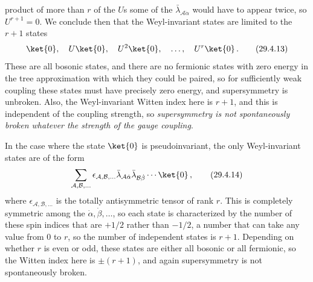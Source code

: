 product of more than \(r\) of the \(U\)s some of the
\(\bar\lambda_{\mathcal A\dot\alpha}\) would have to appear twice, so
\(U^{r+1}=0\). We conclude then that the Weyl-invariant states are limited
to the \(r+1\) states
\begin{equation}
  \ket{0},\quad U\ket{0},\quad U^2\ket{0},\quad\ldots,\quad U^r\ket{0}\,.
  \tag{29.4.13}\label{eq:29.4.13}
\end{equation}
These are all bosonic states, and there are no fermionic states with zero
energy in the tree approximation with which they could be paired, so for
sufficiently weak coupling these states must have precisely zero energy,
and supersymmetry is unbroken. Also, the Weyl-invariant Witten index here
is \(r+1\), and this is independent of the coupling strength, so
\emph{supersymmetry is not spontaneously broken whatever the strength of
the gauge coupling}.

In the case where the state \(\ket{0}\) is pseudoinvariant, the only
Weyl-invariant states are of the form
\begin{equation}
  \sum_{\mathcal A,\mathcal B,\ldots}
  \epsilon_{\mathcal A,\mathcal B,\ldots}
  \bar\lambda_{\mathcal A\dot\alpha}
  \bar\lambda_{\mathcal B\dot\beta}
  \cdots\ket{0}\,,
  \tag{29.4.14}\label{eq:29.4.14}
\end{equation}
where \(\epsilon_{\mathcal A,\mathcal B,\ldots}\) is the totally
antisymmetric tensor of rank \(r\). This is completely symmetric among the
\(\dot\alpha,\dot\beta,\ldots\), so each state is characterized by the
number of these spin indices that are \(+1/2\) rather than \(-1/2\), a number that can take any
value from 0 to \(r\), so the number of independent states is \(r+1\).
Depending on whether \(r\) is even or odd, these states are either all
bosonic or all fermionic, so the Witten index here is \(\pm(r+1)\), and
again supersymmetry is not spontaneously broken.

